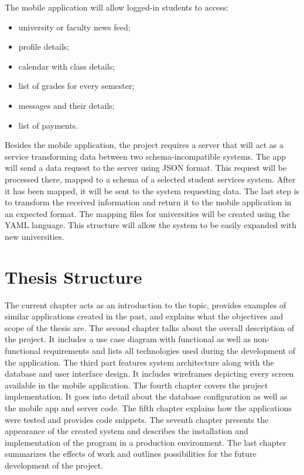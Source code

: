 The mobile application will allow logged-in students to access:
\begin{multicols}{2}
\begin{itemize}
    \item university or faculty news feed;
    \item profile details;
    \item calendar with class details;
    \item list of grades for every semester;
    \item messages and their details;
    \item list of payments.
\end{itemize}
\end{multicols}
Besides the mobile application, the project requires a server that will act as a service transforming data between two schema-incompatible systems. The app will send a data request to the server using JSON format. This request will be processed there, mapped to a schema of a selected student services system. After it has been mapped, it will be sent to the system requesting data. The last step is to transform the received information and return it to the mobile application in an expected format. The mapping files for universities will be created using the YAML language. This structure will allow the system to be easily expanded with new universities.

\section{Thesis Structure}
The current chapter acts as an introduction to the topic, provides examples of similar applications created in the past, and explains what the objectives and scope of the thesis are. The second chapter talks about the overall description of the project. It includes a use case diagram with functional as well as non-functional requirements and lists all technologies used during the development of the application. The third part features system architecture along with the database and user interface design. It includes wireframes depicting every screen available in the mobile application. The fourth chapter covers the project implementation. It goes into detail about the database configuration as well as the mobile app and server code. The fifth chapter explains how the applications were tested and provides code snippets. The seventh chapter presents the appearance of the created system and describes the installation and implementation of the program in a production environment. The last chapter summarizes the effects of work and outlines possibilities for the future development of the project.
